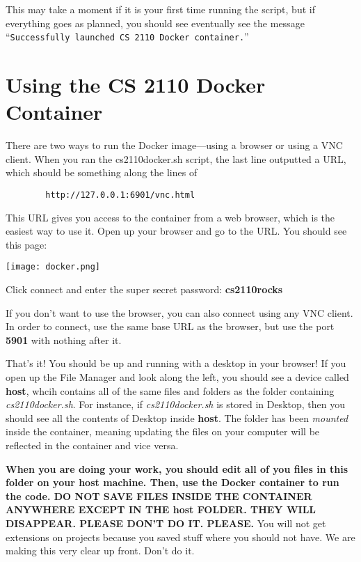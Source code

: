 This may take a moment if it is your first time running the script, but if everything goes as planned, you should see eventually see the message ``\texttt{Successfully launched CS 2110 Docker container.}''


\section{Using the CS 2110 Docker Container}
There are two ways to run the Docker image---using a browser or using a VNC client. When you ran the cs2110docker.sh script, the last line outputted a URL, which should be something along the lines of

\begin{center}
    \begin{verbatim}
        http://127.0.0.1:6901/vnc.html
    \end{verbatim}
\end{center}

This URL gives you access to the container from a web browser, which is the easiest way to use it. Open up your browser and go to the URL. You should see this page:
\begin{center}
    \texttt{[image: docker.png]}
\end{center}
Click connect and enter the super secret password: \textbf{cs2110rocks}

If you don’t want to use the browser, you can also connect using any VNC client. In order to connect, use the same base URL as the browser, but use the port \textbf{5901} with nothing after it.

That’s it! You should be up and running with a desktop in your browser! If you open up the File Manager and look along the left, you should see a device called \textbf{host}, whcih contains all of the same files and folders as the folder containing \textit{cs2110docker.sh}. For instance, if \textit{cs2110docker.sh} is stored in Desktop, then you should see all the contents of Desktop inside \textbf{host}. The folder has been \textit{mounted} inside the container, meaning updating the files on your computer will be reflected in the container and vice versa.


\textbf{When you are doing your work, you should edit all of you files in this folder on your host machine. Then, use the Docker container to run the code. DO NOT SAVE FILES INSIDE THE CONTAINER ANYWHERE EXCEPT IN THE host FOLDER. THEY WILL DISAPPEAR. PLEASE DON’T DO IT. PLEASE.} You will not get extensions on projects because you saved stuff where you should not have. We are making this very clear up front. Don’t do it.

